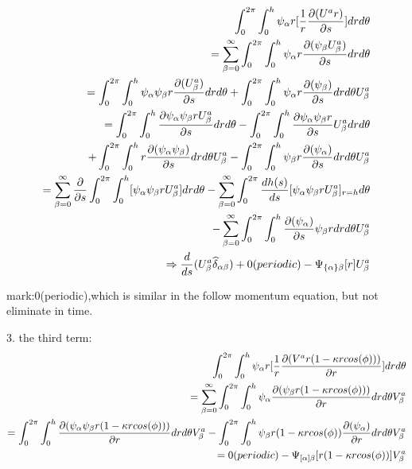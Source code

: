 \documentclass{Note}
\begin{document}
\begin{equation}
\begin{aligned}
\int_0^{2\pi}\int_0^h \psi_\alpha r [{1\over r} {\partial(U^a r)\over \partial s}] dr d\theta\\
=\sum_{\beta=0}^\infty  \int_0^{2\pi}\int_0^h \psi_\alpha r{\partial( \psi_\beta U_\beta^a)\over \partial s} dr d\theta \\
=\int_0^{2\pi}\int_0^h \psi_\alpha \psi_\beta r{\partial( U_\beta^a )\over \partial s} dr d\theta +\int_0^{2\pi}\int_0^h \psi_\alpha r{\partial( \psi_\beta )\over \partial s} dr d\theta U_\beta^a\\
=\int_0^{2\pi}\int_0^h {\partial \psi_\alpha \psi_\beta r U_\beta^a \over \partial s} dr d\theta
-\int_0^{2\pi}\int_0^h {\partial \psi_\alpha \psi_\beta r  \over \partial s}U_\beta^a dr d\theta\\
+\int_0^{2\pi}\int_0^h  r{\partial( \psi_\alpha \psi_\beta )\over \partial s} dr d\theta U_\beta^a
-\int_0^{2\pi}\int_0^h \psi_\beta   r{\partial( \psi_\alpha )\over \partial s} dr d\theta U_\beta^a\\
=\sum_{\beta=0}^\infty  {{\partial }\over {\partial s}}\int_0^{2\pi}\int_0^h   [ \psi_\alpha \psi_\beta r U_\beta^a] dr d\theta 
-\sum_{\beta=0}^\infty  \int_0^{2\pi}{dh(s)\over ds}[ \psi_\alpha \psi_\beta r U_\beta^a]_{r=h}d\theta\\
-\sum_{\beta=0}^\infty  \int_0^{2\pi}\int_0^h   {\partial( \psi_\alpha )\over \partial s}\psi_\beta r dr d\theta U_\beta^a\\
\Rightarrow {d \over d s}(U_\beta^a \widehat{\delta }_{\alpha\beta})+0(periodic)-\Psi_{\{\alpha\}\beta}[r]U_\beta^a
\end{aligned}
\end{equation}

mark:0(periodic),which is similar in the follow momentum equation, but not eliminate in time.

3. the third term:
\begin{equation}
\begin{aligned}
\int_0^{2\pi}\int_0^h \psi_\alpha r [{1\over r}{\partial(V^a r(1-\kappa r cos(\phi)))\over \partial r}] dr d\theta\\
=\sum_{\beta=0}^\infty \int_0^{2\pi}\int_0^h \psi_\alpha {\partial(\psi_\beta r(1-\kappa r cos(\phi)))\over \partial r} dr d\theta V_\beta^a\\
=\int_0^{2\pi}\int_0^h {\partial(\psi_\alpha  \psi_\beta r(1-\kappa r cos(\phi)))\over \partial r}dr d\theta V_\beta^a-\int_0^{2\pi}\int_0^h\psi_\beta  r(1-\kappa r cos(\phi)){\partial(\psi_\alpha  )\over \partial r} dr d\theta V_\beta^a\\
=0(periodic)-\Psi_{[\alpha]\beta}[ r(1-\kappa r cos(\phi))]V_\beta^a
\end{aligned}
\end{equation}
\end{document}
